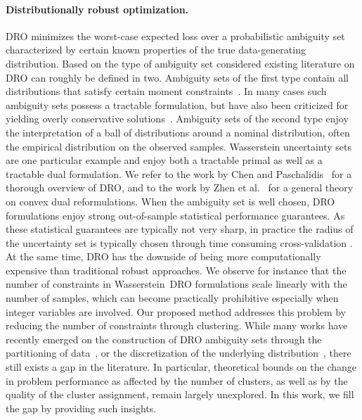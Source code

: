 \documentclass[12pt]{article}
\newcommand{\citep}{\cite}
\theoremstyle{thmstyleone}%
\theoremstyle{thmstyletwo}%
\theoremstyle{thmstylethree}%
\begin{document}
\paragraph{Distributionally robust optimization.}
\gls{DRO} minimizes the worst-case expected loss over a probabilistic ambiguity set characterized by certain known properties of the true data-generating distribution.
Based on the type of ambiguity set considered existing literature on \gls{DRO} can roughly be defined in two.
Ambiguity sets of the first type contain all distributions that satisfy certain moment constraints~\citep{dro_1,dro_2,dro_3,dro_4}.
In many cases such ambiguity sets possess a tractable formulation, but have also been criticized for yielding overly conservative solutions~\citep{dro_5}.
Ambiguity sets of the second type enjoy the interpretation of a ball of distributions around a nominal distribution, often the empirical distribution on the observed samples.
Wasserstein uncertainty sets are one particular example \citep{mohajerin_esfahani_data-driven_2018,kuhn2019wasserstein,DBLP:gao2020,gao2016distributionally} and enjoy both a tractable primal as well as a tractable dual formulation.
We refer to the work by Chen and Paschalidis~\cite{OPT-026} for a thorough overview of \gls{DRO}, and to the work by Zhen et al.~\cite{zhen2021mathematical} for a general theory on convex dual reformulations.
When the ambiguity set is well chosen, \gls{DRO} formulations enjoy strong out-of-sample statistical performance guarantees.
As these statistical guarantees are typically not very sharp, in practice the radius of the uncertainty set is typically chosen through time consuming cross-validation \citep{DBLP:gao2020}.
At the same time, \gls{DRO} has the downside of being more computationally expensive than traditional robust approaches.
We observe for instance that the number of constraints in Wasserstein~\gls{DRO} formulations scale linearly with the number of samples, which can become practically prohibitive especially when integer variables are involved.
Our proposed method addresses this problem by reducing the number of constraints through clustering.
While many works have recently emerged on the construction of \gls{DRO} ambiguity sets through the partitioning of data~\cite{Rsome, partition,perakis2022robust}, or the discretization of the underlying distribution~\cite{droapprox}, there still exists a gap in the literature. In particular, theoretical bounds on the change in problem performance as affected by the number of clusters, as well as by the quality of the cluster assignment, remain largely unexplored.
In this work, we fill the gap by providing such insights.
\end{document}
